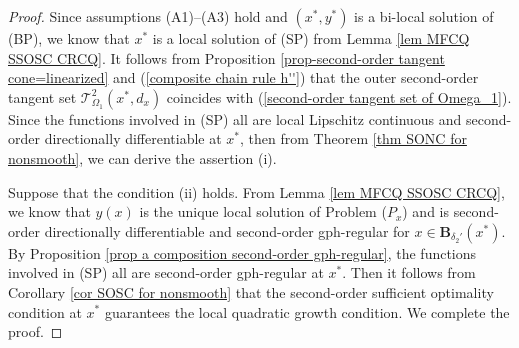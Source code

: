 \documentclass[11pt]{article}
\theoremstyle{definition}
\theoremstyle{remark}
\numberwithin{equation}{section}
\begin{document}
\begin{proof}
Since assumptions \textnormal{(A1)}--\textnormal{(A3) hold and $(x^*,y^*)$ is a bi-local solution of (BP), we   know that
  $x^*$ is a local solution of (SP) from  Lemma \ref{lem MFCQ SSOSC CRCQ}.}
 It follows from Proposition \ref{prop-second-order tangent cone=linearized} and (\ref{composite chain rule h''})
 that
 the outer second-order tangent set $\mathcal{T}_{\Omega_1}^2(x^*,d_x)$ coincides with
 (\ref{second-order tangent set of Omega_1}).
  Since the functions involved in (SP) all are local Lipschitz continuous and second-order
 directionally differentiable at $x^*$, then from Theorem \ref{thm SONC for nonsmooth}, we can derive the
 assertion (i).

Suppose that  the condition (ii) holds. From  Lemma \ref{lem MFCQ SSOSC CRCQ},
  we know that $y(x)$ is the unique local solution of  Problem ($P_{x}$)
  and is second-order directionally differentiable and second-order gph-regular
 for $x\in \boldsymbol{B}_{\delta_2'}(x^*)$.
  By Proposition \ref{prop a composition
   second-order gph-regular}, the functions involved in (SP) all  are second-order gph-regular at $x^*$.
   Then it follows from %
Corollary \ref{cor SOSC for nonsmooth}   that the second-order sufficient optimality condition at $x^*$ guarantees the
   local quadratic growth condition.
We complete the proof.
\end{proof}
\end{document}
